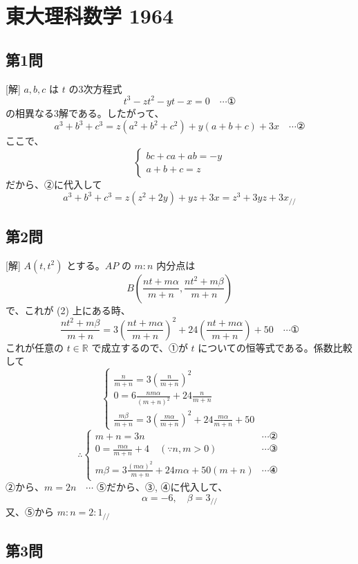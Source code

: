 \documentclass[../main.tex]{subfiles}
\begin{document}
\section*{東大理科数学 1964}

\subsection*{第1問}

[解] $a, b, c$ は $t$ の3次方程式
\[
  t^3 - z t^2 - y t - x = 0 \quad \cdots \text{①}
\]
の相異なる3解である。したがって、
\[
  a^3 + b^3 + c^3 = z(a^2 + b^2 + c^2) + y(a + b + c) + 3x \quad \cdots \text{②}
\]
ここで、
\[
  \begin{cases}
    bc + ca + ab = -y \\
    a + b + c = z
  \end{cases}
\]
だから、②に代入して
\[
  a^3 + b^3 + c^3 = z(z^2 + 2y) + y z + 3x = z^3 + 3yz + 3x_{\mathbin{/\!/}}
\]

\subsection*{第2問}

[解] $A(t, t^2)$ とする。$AP$ の $m:n$ 内分点は
\[
  B\left(\frac{nt+m\alpha}{m+n}, \frac{nt^2+m\beta}{m+n}\right)
\]
で、これが (2) 上にある時、
\[
  \frac{nt^2+m\beta}{m+n} = 3\left(\frac{nt+m\alpha}{m+n}\right)^2 + 24\left(\frac{nt+m\alpha}{m+n}\right) + 50 \quad \cdots \text{①}
\]
これが任意の $t \in \mathbb{R}$ で成立するので、①が $t$ についての恒等式である。係数比較して
\[
  \begin{cases}
    \frac{n}{m+n} = 3\left(\frac{n}{m+n}\right)^2 \\
    0 = 6\frac{n m \alpha}{(m+n)^2} + 24\frac{n}{m+n} \\
    \frac{m\beta}{m+n} = 3\left(\frac{m\alpha}{m+n}\right)^2 + 24\frac{m\alpha}{m+n} + 50
  \end{cases}
\]
\[
  \therefore
  \begin{cases}
    m+n = 3n & \cdots \text{②} \\
    0 = \frac{m\alpha}{m+n} + 4 \quad (\because n, m > 0) & \cdots \text{③} \\
    m\beta = 3\frac{(m\alpha)^2}{m+n} + 24m\alpha + 50(m+n) & \cdots \text{④}
  \end{cases}
\]
②から、$m = 2n \quad \cdots$ ⑤だから、③, ④に代入して、
\[
  \alpha = -6, \quad \beta = 3_{\mathbin{/\!/}}
\]
又、⑤から $m:n = 2:1_{\mathbin{/\!/}}$

\subsection*{第3問}
\end{document}
